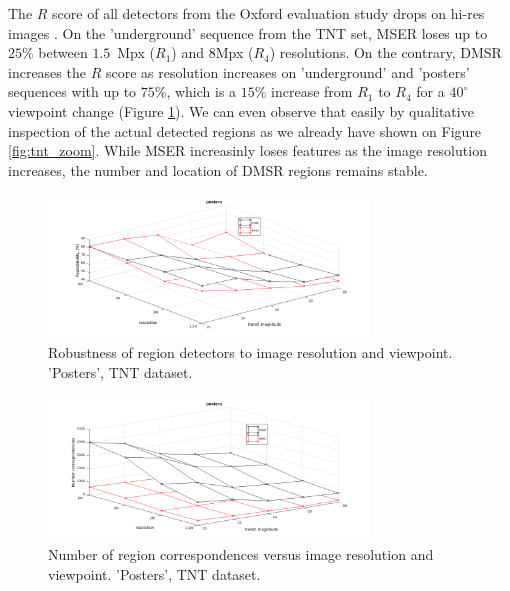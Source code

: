 \documentclass[conference,compsoc]{IEEEtran}
\begin{document}
The $R$ score of all detectors from the Oxford evaluation study drops on hi-res images \cite{CorRos2013}. On the 'underground' sequence from the TNT set, MSER loses up to $25\%$ between $1.5$~Mpx ($R_1$) and $8$Mpx ($R_4$) resolutions. On the contrary, DMSR increases the $R$ score as resolution increases on 'underground' and 'posters' sequences with up to $75\%$, which is a $15\%$ increase from $R_1$ to $R_4$ for a $40^{\circ}$ viewpoint change (Figure \ref{fig:tnt}). We can even observe that easily by qualitative inspection of the actual detected regions as we already have shown on Figure \ref{fig:tnt_zoom}. While MSER increasinly loses features as the image resolution increases, the number and location of DMSR regions remains stable.

\begin{figure}[htb]

\begin{minipage}[b]{.9\linewidth}
  \centering
  \centerline{\includegraphics[width=8.5cm]{posters_rep}}
\end{minipage}
\hfill
\caption{Robustness of region detectors to image resolution and viewpoint. 'Posters', TNT dataset.}
\label{fig:tnt}
\vspace{-0.25cm}
\end{figure}
\begin{figure}[htb]

\begin{minipage}[b]{0.9\linewidth}
  \centering
  \centerline{\includegraphics[width=8.5cm]{posters_numreg}}
\end{minipage}
\caption{Number of region correspondences versus image resolution and viewpoint. 'Posters', TNT dataset.}
\label{fig:tnt_numreg}
%
\end{figure}
\end{document}
